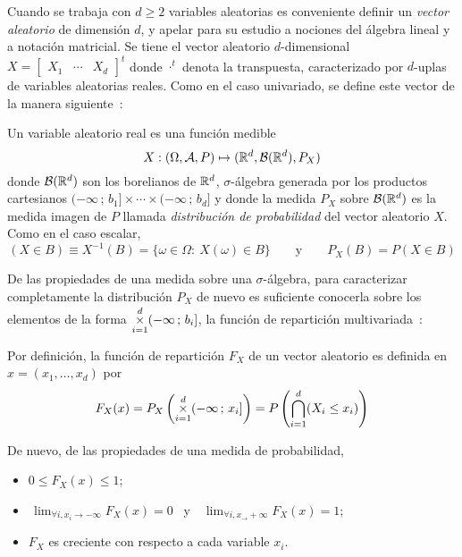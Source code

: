 Cuando se trabaja  con $d\geq 2$ variables aleatorias  es conveniente definir un
{\it vector aleatorio}  de dimensi\'on $d$, y apelar para  su estudio a nociones
del \'algebra  lineal y  a notaci\'on matricial.   Se tiene el  vector aleatorio
$d$-dimensional \ $X = \begin{bmatrix} X_1 & \cdots & X_d \end{bmatrix}^t$ donde
$\cdot^t$  denota  la  transpuesta,  caracterizado por  $d$-uplas  de  variables
aleatorias reales.   Como en  el caso  univariado, se define  este vector  de la
manera siguiente~\cite{AthLah06, Coh13, Bre88}:
%
\begin{definicion}
  Un variable aleatorio real es una funci\'on medible
  \[
  X: (\Omega,\mathcal{A},P) \mapsto (\mathbb{R}^d,\mathcal{B}(\mathbb{R}^d),P_X)
  \]
  donde  $\mathcal{B}(\mathbb{R}^d)$  son  los  borelianos  de  $\mathbb{R}^d$,  $\sigma$-\'algebra
  generada por  los productos cartesianos $(-\infty  \, ; \,  b_1] \times \cdots
  \times (-\infty \,  ; \, b_d]$ y donde la medida  $P_X$ sobre $\mathcal{B}(\mathbb{R}^d)$ es
  la  medida imagen  de $P$  llamada  {\it distribuci\'on  de probabilidad}  del
  vector aleatorio $X$. Como en el caso escalar,
 \[
 (X \in B) \equiv X^{-1}(B) = \{ \omega \in \Omega: \: X(\omega) \in B \} \qquad
 \mbox{y} \qquad P_X(B) = P(X \in B)
 \]
\end{definicion}
%
De las propiedades de una medida sobre una $\sigma$-\'algebra, para caracterizar
completamente la distribuci\'on $P_X$ de nuevo es suficiente conocerla sobre los
elementos de  la forma $\displaystyle  \operatorname*{\times}_{i=1}^d (-\infty \, ;  \, b_i]$,
\ie  la funci\'on  de repartici\'on  multivariada~\cite{AthLah06,  Coh13, Bre88,
  HogMck13}:
%
\begin{definicion}
  Por  definici\'on,  la  funci\'on  de  repartici\'on  $F_X$  de  un vector
  aleatorio es definida en $x = (x_1 , \ldots , x_d)$ por
  \[
  F_X(x) =  P_X\left( \operatorname*{\times}_{i=1}^d (-\infty \,  ; \, x_i]  \right) = P\left(
    \bigcap_{i=1}^d (X_i \le x_i) \right)
  \]
\end{definicion}
%
De nuevo, de las propiedades de una medida de probabilidad,
%
\begin{itemize}
\item $0 \le F_X(x) \le 1$;
%
\item $\displaystyle  \, \lim_{\forall  i, x_i \to  -\infty} F_X(x)  = 0$ \  y \
  $\displaystyle \, \lim_{\forall i, x_ \to +\infty} F_X(x) = 1$;
%
\item $F_X$ es creciente con respecto a cada variable $x_i$.
\end{itemize}
